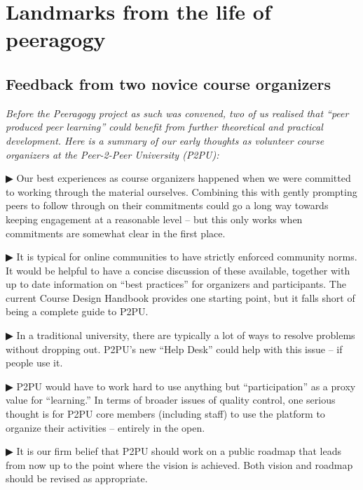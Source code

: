 \section*{Landmarks from the life of peeragogy}

\begin{mdframed}
\subsection{Feedback from two novice course organizers}

\emph{Before the Peeragogy project as such was convened, two of us
  realised that ``peer produced peer learning'' could benefit from
  further theoretical and practical development.  Here is a summary of
  our early thoughts as volunteer course organizers at the Peer-2-Peer
  University (P2PU):}

▶ Our best experiences as course organizers happened when we were committed to working through the material ourselves. Combining this with gently prompting peers to follow through on their commitments could go a long way towards keeping engagement at a reasonable level – but this only works when commitments are somewhat clear in the first place. 

▶ It is typical for online communities to have strictly enforced community norms. It would be helpful to have a concise discussion of these available, together with up to date information on “best practices” for organizers and participants. The current Course Design Handbook provides one starting point, but it falls short of being a complete guide to P2PU.

▶ In a traditional university, there are typically a lot of ways to resolve problems without dropping out. P2PU’s new “Help Desk” could help with this issue -- if people use it.

▶ P2PU would have to work hard to use anything but “participation” as a proxy value for ``learning.'' In terms of broader issues of quality control, one serious thought is for P2PU core members (including staff) to use the platform to organize their activities – entirely in the open.

▶ It is our firm belief that P2PU should work on a public roadmap that leads from now up to the point where the vision is achieved. Both vision and roadmap should be revised as appropriate.
\end{mdframed}

